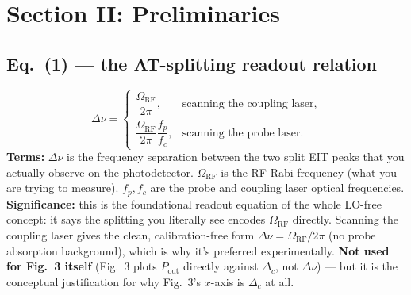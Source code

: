 \documentclass[11pt]{article}
\begin{document}
\section{Section II: Preliminaries}

\subsection*{Eq.~(1) --- the AT-splitting readout relation}
\begin{equation}
\Delta\nu =
\begin{cases}
\dfrac{\Omega_\text{RF}}{2\pi}, & \text{scanning the coupling laser},\\[2mm]
\dfrac{\Omega_\text{RF}}{2\pi}\dfrac{f_p}{f_c}, & \text{scanning the probe laser}.
\end{cases}
\tag{1}
\end{equation}
\textbf{Terms:} $\Delta\nu$ is the frequency separation between the two
split EIT peaks that you actually observe on the photodetector.
$\Omega_\text{RF}$ is the RF Rabi frequency (what you are trying to
measure). $f_p,f_c$ are the probe and coupling laser optical
frequencies.
\textbf{Significance:} this is the foundational readout equation of the
whole LO-free concept: it says the splitting you literally see encodes
$\Omega_\text{RF}$ directly. Scanning the coupling laser gives the
clean, calibration-free form $\Delta\nu=\Omega_\text{RF}/2\pi$ (no probe
absorption background), which is why it's preferred experimentally.
\textbf{Not used for Fig.~3 itself} (Fig.~3 plots $P_\text{out}$ directly
against $\Delta_c$, not $\Delta\nu$) --- but it is the conceptual
justification for why Fig.~3's $x$-axis is $\Delta_c$ at all.
\end{document}
